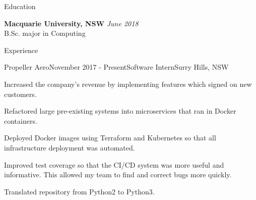 \documentclass{resume} %
\begin{document}

\begin{rSection}{Education}

{\bf Macquarie University, NSW} \hfill {\em June 2018} \\ 
B.Sc. major in Computing \\

\end{rSection}


\begin{rSection}{Experience}

\begin{rSubsection}{Propeller Aero}{November 2017 - Present}{Software Intern}{Surry Hills, NSW}
\item Increased the company's revenue by implementing features which signed on new customers.
\item Refactored large pre-existing systems into microservices that ran in Docker containers. 
\item Deployed Docker images using Terraform and Kubernetes so that all infrastructure deployment was automated.
\item Improved test coverage so that the CI/CD system was more useful and informative. This allowed my team to find and correct bugs more quickly.
\item Translated repository from Python2 to Python3.
\end{rSubsection}

\end{rSection}

\end{document}
